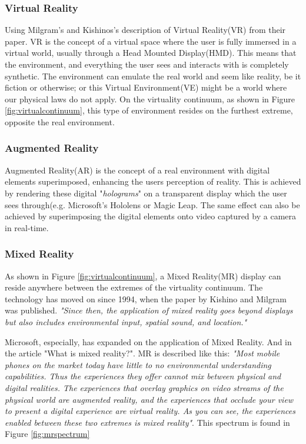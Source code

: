         \subsubsection{Virtual Reality}
        Using Milgram's and Kishinos's description of Virtual Reality(VR) from their paper.\cite{Milgram1994} VR is the concept of a virtual space where the user is fully immersed in a virtual world, usually through a Head Mounted Display(HMD). This means that the environment, and everything the user sees and interacts with is completely synthetic. The environment can emulate the real world and seem like reality, be it fiction or otherwise; or this Virtual Environment(VE) might be a world where our physical laws do not apply. On the virtuality continuum, as shown in Figure \ref{fig:virtualcontinuum}, this type of environment resides on the furthest extreme, opposite the real environment.
    
        \subsubsection{Augmented Reality}
        Augmented Reality(AR) is the concept of a real environment with digital elements superimposed, enhancing the users perception of reality.\cite{Milgram1994} This is achieved by rendering these digital "\emph{holograms}" on a transparent display which the user sees through(e.g. Microsoft's Hololens or Magic Leap. The same effect can also be achieved by superimposing the digital elements onto video captured by a camera in real-time.
        
        \subsubsection{Mixed Reality}
        As shown in Figure \ref{fig:virtualcontinuum}, a Mixed Reality(MR) display can reside anywhere between the extremes of the virtuality continuum\cite{Milgram1994}. The technology has moved on since 1994, when the paper by Kishino and Milgram was published. \emph{"Since then, the application of mixed reality goes beyond displays but also includes environmental input, spatial sound, and location."}\cite{wdc-mr}
        
        Microsoft, especially, has expanded on the application of Mixed Reality. And in the article "What is mixed reality?"\cite{wdc-mr}. MR is described like this: \emph{"Most mobile phones on the market today have little to no environmental understanding capabilities. Thus the experiences they offer cannot mix between physical and digital realities. The experiences that overlay graphics on video streams of the physical world are augmented reality, and the experiences that occlude your view to present a digital experience are virtual reality. As you can see, the experiences enabled between these two extremes is mixed reality"}\cite{wdc-mr}. This spectrum is found in Figure \ref{fig:mrspectrum}
        

